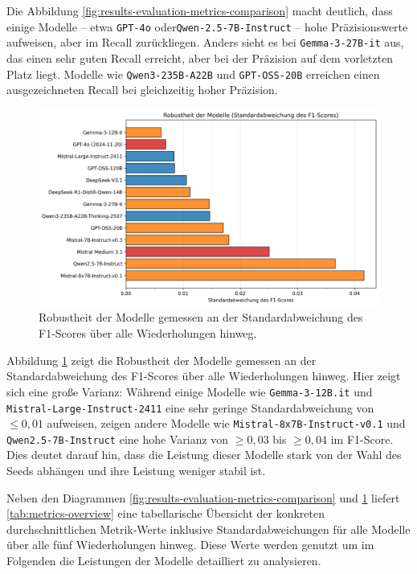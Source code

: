 Die Abbildung \ref{fig:results-evaluation-metrics-comparison} macht deutlich, dass einige Modelle – etwa \texttt{GPT-4o} oder\linebreak\texttt{Qwen-2.5-7B-Instruct} – hohe Präzisionswerte aufweisen, aber im Recall zurückliegen. Anders sieht es bei \texttt{Gemma-3-27B-it} aus, das einen sehr guten Recall erreicht, aber bei der Präzision auf dem vorletzten Platz liegt. Modelle wie \texttt{Qwen3-235B-A22B} und \texttt{GPT-OSS-20B} erreichen einen ausgezeichneten Recall bei gleichzeitig hoher Präzision.

\begin{figure}[htbp]
    \centering
    \includegraphics[width=\textwidth,trim=20 40 20 10,clip]{images/results/evaluation_robustness_f1_std}
    \caption{Robustheit der Modelle gemessen an der Standardabweichung des F1-Scores über alle Wiederholungen hinweg.}
    \label{fig:results-evaluation-robustness-f1-std}
\end{figure}

Abbildung \ref{fig:results-evaluation-robustness-f1-std} zeigt die Robustheit der Modelle gemessen an der Standardabweichung des F1-Scores über alle Wiederholungen hinweg. Hier zeigt sich eine große Varianz: Während einige Modelle wie \texttt{Gemma-3-12B.it} und \texttt{Mistral-Large-Instruct-2411} eine sehr geringe Standardabweichung von $\le 0{,}01$ aufweisen, zeigen andere Modelle wie \texttt{Mistral-8x7B-Instruct-v0.1} und \texttt{Qwen2.5-7B-Instruct} eine hohe Varianz von $\ge 0{,}03$ bis $\ge 0{,}04$ im F1-Score. Dies deutet darauf hin, dass die Leistung dieser Modelle stark von der Wahl des Seeds abhängen und ihre Leistung weniger stabil ist.

Neben den Diagrammen \ref{fig:results-evaluation-metrics-comparison} und \ref{fig:results-evaluation-robustness-f1-std} liefert \autoref{tab:metrics-overview} eine tabellarische
Übersicht der konkreten durchschnittlichen Metrik-Werte inklusive Standardabweichungen für alle Modelle über alle fünf Wiederholungen hinweg. Diese Werte werden genutzt um im Folgenden die Leistungen der Modelle detailliert zu analysieren.

